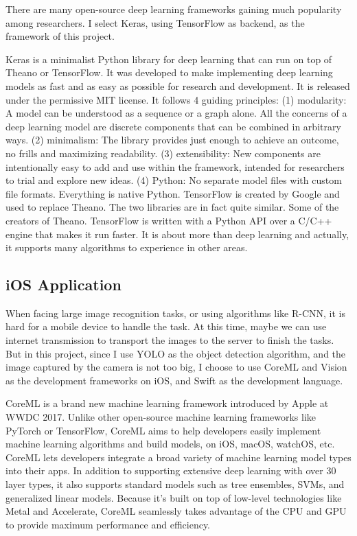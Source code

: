 \documentclass{article}
\begin{document}
There are many open-source deep learning frameworks gaining much popularity among researchers. I select Keras, using TensorFlow as backend, as the framework of this project.

Keras is a minimalist Python library for deep learning that can run on top of Theano or TensorFlow. It was developed to make implementing deep learning models as fast and as easy as possible for research and development. It is released under the permissive MIT license. It follows 4 guiding principles: (1) modularity: A model can be understood as a sequence or a graph alone. All the concerns of a deep learning model are discrete components that can be combined in arbitrary ways. (2) minimalism: The library provides just enough to achieve an outcome, no frills and maximizing readability. (3) extensibility: New components are intentionally easy to add and use within the framework, intended for researchers to trial and explore new ideas. (4) Python: No separate model files with custom file formats. Everything is native Python. TensorFlow is created by Google and used to replace Theano. The two libraries are in fact quite similar. Some of the creators of Theano. TensorFlow is written with a Python API over a C/C++ engine that makes it run faster. It is about more than deep learning and actually, it supports many algorithms to experience in other areas.

\subsection{iOS Application}

When facing large image recognition tasks, or using algorithms like R-CNN, it is hard for a mobile device to handle the task. At this time, maybe we can use internet transmission to transport the images to the server to finish the tasks. But in this project, since I use YOLO as the object detection algorithm, and the image captured by the camera is not too big, I choose to use CoreML and Vision as the development frameworks on iOS, and Swift as the development language.

CoreML is a brand new machine learning framework introduced by Apple at WWDC 2017. Unlike other open-source machine learning frameworks like PyTorch or TensorFlow, CoreML aims to help developers easily implement machine learning algorithms and build models, on iOS, macOS, watchOS, etc. CoreML lets developers integrate a broad variety of machine learning model types into their apps. In addition to supporting extensive deep learning with over 30 layer types, it also supports standard models such as tree ensembles, SVMs, and generalized linear models. Because it’s built on top of low-level technologies like Metal and Accelerate, CoreML seamlessly takes advantage of the CPU and GPU to provide maximum performance and efficiency.
\end{document}
